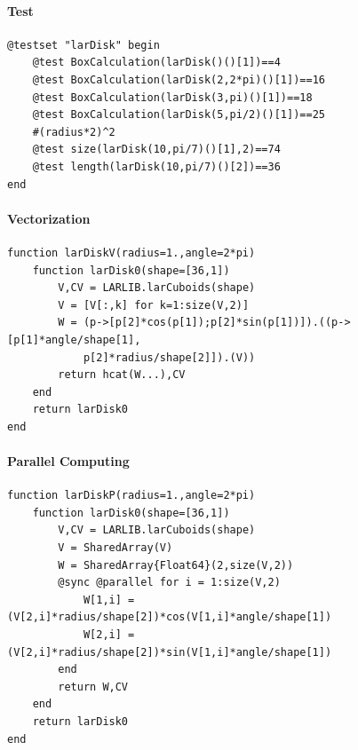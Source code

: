 \documentclass{article}
\begin{document}
\paragraph{Test}

\begin{Verbatim}
@testset "larDisk" begin
	@test BoxCalculation(larDisk()()[1])==4
	@test BoxCalculation(larDisk(2,2*pi)()[1])==16
	@test BoxCalculation(larDisk(3,pi)()[1])==18
	@test BoxCalculation(larDisk(5,pi/2)()[1])==25
	#(radius*2)^2
	@test size(larDisk(10,pi/7)()[1],2)==74
	@test length(larDisk(10,pi/7)()[2])==36
end
\end{Verbatim}

\paragraph{Vectorization}

\begin{verbatim}
function larDiskV(radius=1.,angle=2*pi)
    function larDisk0(shape=[36,1])
        V,CV = LARLIB.larCuboids(shape)
        V = [V[:,k] for k=1:size(V,2)]
        W = (p->[p[2]*cos(p[1]);p[2]*sin(p[1])]).((p->[p[1]*angle/shape[1],
            p[2]*radius/shape[2]]).(V))
        return hcat(W...),CV
    end
    return larDisk0    
end
\end{verbatim}

\paragraph{Parallel Computing} 

\begin{Verbatim}
function larDiskP(radius=1.,angle=2*pi)
    function larDisk0(shape=[36,1])
        V,CV = LARLIB.larCuboids(shape)
        V = SharedArray(V)
        W = SharedArray{Float64}(2,size(V,2))
        @sync @parallel for i = 1:size(V,2)
            W[1,i] = (V[2,i]*radius/shape[2])*cos(V[1,i]*angle/shape[1])
            W[2,i] = (V[2,i]*radius/shape[2])*sin(V[1,i]*angle/shape[1])
        end
        return W,CV
    end
    return larDisk0    
end
\end{Verbatim}
\end{document}
